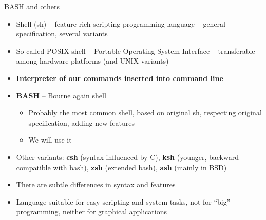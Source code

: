\documentclass[compress, ucs, xelatex, 11pt, xcolor=svgnames,
  hyperref={
    bookmarks=true,
    unicode=true,
    colorlinks=true,
    pdftitle={Linux, command line and MetaCentrum},
    plainpages=false,
    pdfauthor={Vojtech Zeisek},
    pdfsubject={Course about use of Linux command line, writing shell scripts and using MetaCentrum of CESNET},
    pdfcreator={XeLaTeX},
    pdfkeywords={Linux, GNU, BASH, shell, command line, MetaCentrum},
    linkcolor=Red,
    anchorcolor=Blue,
    citecolor=Purple,
    filecolor=DodgerBlue,
    menucolor=DarkOrchid,
    urlcolor=DeepSkyBlue,
    pdftex},
  url={hyphens, lowtilde} %
  ]{beamer}
\begin{document}
\begin{frame}{BASH and others}
\begin{itemize}
  \item Shell (sh) -- feature rich scripting programming language -- general specification, several variants
  \item So called POSIX shell -- Portable Operating System Interface -- transferable among hardware platforms (and UNIX variants)
  \item \textbf{Interpreter of our commands inserted into command line}
  \item \textbf{BASH} -- Bourne again shell
  \begin{itemize}
    \item Probably the most common shell, based on original sh, respecting original specification, adding new features
    \item We will use it
  \end{itemize}
  \item Other variants: \textbf{csh} (syntax influenced by C), \textbf{ksh} (younger, backward compatible with bash), \textbf{zsh} (extended bash), \textbf{ash} (mainly in BSD)
  \item There are subtle differences in syntax and features
  \item Language suitable for easy scripting and system tasks, not for ``big'' programming, neither for graphical applications
\end{itemize}
\end{frame}
\end{document}
